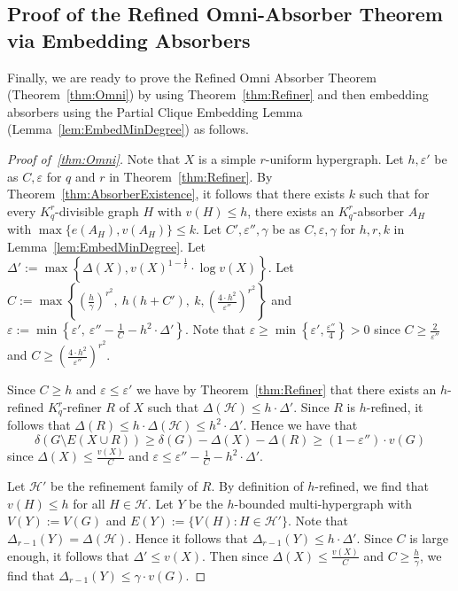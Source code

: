 \documentclass[11pt]{article}
\newcounter{i}
\theoremstyle{plain}
\renewcommand{\theclaim}{\thetheorem.\arabic{claim}}
\newenvironment{lateproof}[1]
 {%
  \renewcommand{\theclaim}{\ref{#1}.\arabic{claim}}%
  \begin{proof}[Proof of~\cref{#1}]%
 }
 {\end{proof}}
\theoremstyle{plain} %
\theoremstyle{definition}
\begin{document}
\subsection{Proof of the Refined Omni-Absorber Theorem via Embedding Absorbers}

Finally, we are ready to prove the Refined Omni Absorber Theorem (Theorem~\ref{thm:Omni}) by using Theorem~\ref{thm:Refiner} and then embedding absorbers using the Partial Clique Embedding Lemma (Lemma~\ref{lem:EmbedMinDegree}) as follows.

\begin{lateproof}{thm:Omni}
Note that $X$ is a simple $r$-uniform hypergraph. Let $h, \varepsilon'$ be as $C,\varepsilon$ for $q$ and $r$ in Theorem~\ref{thm:Refiner}. By Theorem~\ref{thm:AbsorberExistence}, it follows that there exists $k$ such that for every $K_q^r$-divisible graph $H$ with $v(H)\le h$, there exists an $K_q^r$-absorber $A_H$ with $\max\{e(A_H),v(A_H)\}\le k$. Let $C',\varepsilon'',\gamma$ be as $C, \varepsilon, \gamma$  for $h,r,k$ in Lemma~\ref{lem:EmbedMinDegree}. Let $\Delta' := \max\left\{\Delta(X), v(X)^{1-\frac{1}{r}}\cdot \log v(X)\right\}$. Let $C:= \max \left\{ \left(\frac{h}{\gamma}\right)^{r^2},~h(h+C'),~k, \left(\frac{4\cdot h^2}{\varepsilon''}\right)^{r^2} \right\}$ and $\varepsilon := \min \left\{ \varepsilon',~\varepsilon'' - \frac{1}{C}-h^2\cdot \Delta'\right\}$. Note that $\varepsilon \ge \min\left\{\varepsilon',\frac{\varepsilon''}{4}\right\} > 0$ since $C\ge \frac{2}{\varepsilon''}$ and $C\ge \left(\frac{4\cdot h^2}{\varepsilon''}\right)^{r^2} $. 

Since $C\ge h$ and $\varepsilon\le \varepsilon'$ we have by Theorem~\ref{thm:Refiner} that there exists an $h$-refined $K_q^r$-refiner $R$ of $X$ such that $\Delta(\mathcal{H}) \le h \cdot \Delta'$. Since $R$ is $h$-refined, it follows that $\Delta(R)\le h\cdot \Delta(\mathcal{H}) \le h^2 \cdot \Delta'$. Hence we have that
$$\delta(G\setminus E(X\cup R)) \ge \delta(G) - \Delta(X) - \Delta(R) \ge (1-\varepsilon'')\cdot v(G)$$ 
 since $\Delta(X) \le \frac{v(X)}{C}$ and $\varepsilon \le \varepsilon''-\frac{1}{C} - h^2\cdot \Delta'$.


Let $\mathcal{H}'$ be the refinement family of $R$. By definition of $h$-refined, we find that $v(H)\le h$ for all $H\in\mathcal{H}$. Let $Y$ be the $h$-bounded multi-hypergraph with $V(Y) :=V(G)$ and $E(Y) := \{ V(H): H \in \mathcal{H}'\}$. Note that  $\Delta_{r-1}(Y)=\Delta(\mathcal{H})$. Hence it follows that $\Delta_{r-1}(Y)\le h\cdot \Delta'$. Since $C$ is large enough, it follows that $\Delta'\le v(X)$. Then since $\Delta(X) \le \frac{v(X)}{C}$ and $C\ge\frac{h}{\gamma}$, we find that $\Delta_{r-1}(Y)\le \gamma\cdot v(G)$.



\end{lateproof}
\end{document}
